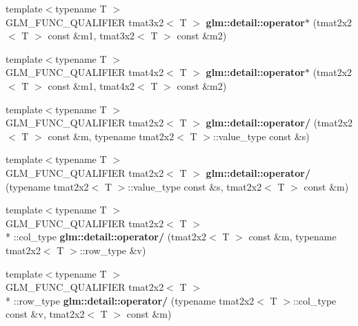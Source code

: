 \begin{DoxyCompactItemize}
\item 
\hypertarget{namespaceglm_1_1detail_a29c589fdf1db79d32c2cdcaeddbee2f2}{{\footnotesize template$<$typename T $>$ }\\G\-L\-M\-\_\-\-F\-U\-N\-C\-\_\-\-Q\-U\-A\-L\-I\-F\-I\-E\-R tmat3x2$<$ T $>$ {\bfseries glm\-::detail\-::operator$\ast$} (tmat2x2$<$ T $>$ const \&m1, tmat3x2$<$ T $>$ const \&m2)}\label{namespaceglm_1_1detail_a29c589fdf1db79d32c2cdcaeddbee2f2}

\item 
\hypertarget{namespaceglm_1_1detail_ad765e69f705999671458236fc5271e0b}{{\footnotesize template$<$typename T $>$ }\\G\-L\-M\-\_\-\-F\-U\-N\-C\-\_\-\-Q\-U\-A\-L\-I\-F\-I\-E\-R tmat4x2$<$ T $>$ {\bfseries glm\-::detail\-::operator$\ast$} (tmat2x2$<$ T $>$ const \&m1, tmat4x2$<$ T $>$ const \&m2)}\label{namespaceglm_1_1detail_ad765e69f705999671458236fc5271e0b}

\item 
\hypertarget{namespaceglm_1_1detail_af6a4bb1f648c3f304c3df0eb232e92b4}{{\footnotesize template$<$typename T $>$ }\\G\-L\-M\-\_\-\-F\-U\-N\-C\-\_\-\-Q\-U\-A\-L\-I\-F\-I\-E\-R tmat2x2$<$ T $>$ {\bfseries glm\-::detail\-::operator/} (tmat2x2$<$ T $>$ const \&m, typename tmat2x2$<$ T $>$\-::value\-\_\-type const \&s)}\label{namespaceglm_1_1detail_af6a4bb1f648c3f304c3df0eb232e92b4}

\item 
\hypertarget{namespaceglm_1_1detail_a38fd054976ac62c77c250ae9c8c159df}{{\footnotesize template$<$typename T $>$ }\\G\-L\-M\-\_\-\-F\-U\-N\-C\-\_\-\-Q\-U\-A\-L\-I\-F\-I\-E\-R tmat2x2$<$ T $>$ {\bfseries glm\-::detail\-::operator/} (typename tmat2x2$<$ T $>$\-::value\-\_\-type const \&s, tmat2x2$<$ T $>$ const \&m)}\label{namespaceglm_1_1detail_a38fd054976ac62c77c250ae9c8c159df}

\item 
\hypertarget{namespaceglm_1_1detail_a9536cd5c5d11934a15c37f40e6ffe443}{{\footnotesize template$<$typename T $>$ }\\G\-L\-M\-\_\-\-F\-U\-N\-C\-\_\-\-Q\-U\-A\-L\-I\-F\-I\-E\-R tmat2x2$<$ T $>$\\*
\-::col\-\_\-type {\bfseries glm\-::detail\-::operator/} (tmat2x2$<$ T $>$ const \&m, typename tmat2x2$<$ T $>$\-::row\-\_\-type \&v)}\label{namespaceglm_1_1detail_a9536cd5c5d11934a15c37f40e6ffe443}

\item 
\hypertarget{namespaceglm_1_1detail_af9e81bd9e91febb17004379caf5735a8}{{\footnotesize template$<$typename T $>$ }\\G\-L\-M\-\_\-\-F\-U\-N\-C\-\_\-\-Q\-U\-A\-L\-I\-F\-I\-E\-R tmat2x2$<$ T $>$\\*
\-::row\-\_\-type {\bfseries glm\-::detail\-::operator/} (typename tmat2x2$<$ T $>$\-::col\-\_\-type const \&v, tmat2x2$<$ T $>$ const \&m)}\label{namespaceglm_1_1detail_af9e81bd9e91febb17004379caf5735a8}


\end{DoxyCompactItemize}
